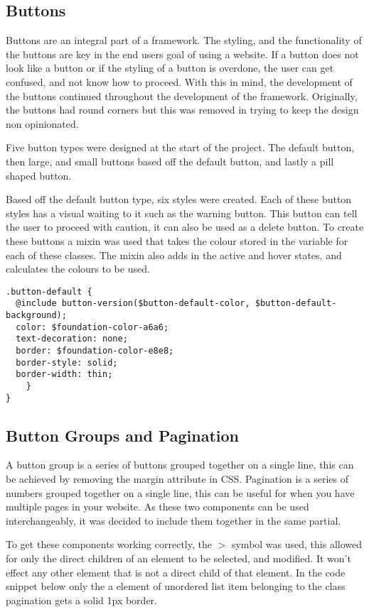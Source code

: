 \subsection*{Buttons}
Buttons are an integral part of a framework. The styling, and the functionality of the buttons are key in the end users goal of using a website. If a button does not look like a button or if the styling of a button is overdone, the user can get confused, and not know how to proceed. With this in mind, the development of the buttons continued throughout the development of the framework. Originally, the buttons had round corners but this was removed in trying to keep the design non opinionated. 

Five button types were designed at the start of the project. The default button, then large, and small buttons based off the default button, and lastly a pill shaped button. 

Based off the default button type, six styles were created. Each of these button styles has a visual waiting to it such as the warning button. This button can tell the user to proceed with caution, it can also be used as a delete button. To create these buttons a mixin was used that takes the colour stored in the variable for each of these classes. The mixin also adds in the active and hover states, and calculates the colours to be used. 

\begin{lstlisting}[language=CSS3]
.button-default {
  @include button-version($button-default-color, $button-default-background);
  color: $foundation-color-a6a6;
  text-decoration: none;
  border: $foundation-color-e8e8;
  border-style: solid;
  border-width: thin;
	}
}
\end{lstlisting}

\newpage
\subsection*{Button Groups and Pagination}
A button group is a series of buttons grouped together on a single line, this can be achieved by removing the margin attribute in CSS. Pagination is a series of numbers grouped together on a single line, this can be useful for when you have multiple pages in your website. As these two components can be used interchangeably, it was decided to include them together in the same partial.

To get these components working correctly, the $>$ symbol was used, this allowed for only the direct children of an element to be selected, and modified. It won't effect any other element that is not a direct child of that element. In the code snippet below only the a element of unordered list item belonging to the class pagination gets a solid 1px border.   

